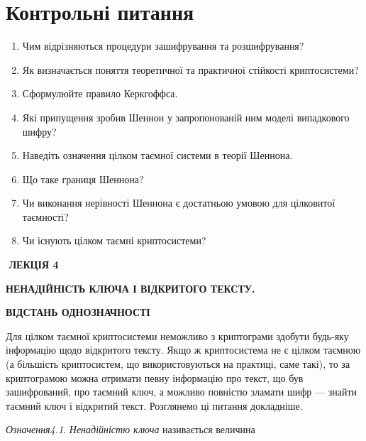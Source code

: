 \section{Контрольні питання}


\bigskip


\bigskip

\liststyleWWviiiNumxlv
\begin{enumerate}
\item Чим відрізняються процедури зашифрування та розшифрування?
\item Як визначається поняття теоретичної та практичної стійкості криптосистеми?
\item Сформулюйте правило Керкгоффса.
\item Які припущення зробив Шеннон у запропонованій ним моделі випадкового
шифру?
\item Наведіть означення цілком таємної системи в теорії Шеннона.
\item Що таке границя Шеннона?
\item Чи виконання нерівності Шеннона є достатньою умовою для цілковитої
таємності?
\item Чи існують цілком таємні криптосистеми? 
\end{enumerate}

\bigskip


\bigskip


\bigskip

 $ $\textbf{ ЛЕКЦІЯ  4}


\bigskip

{\centering\bfseries
НЕНАДІЙНІСТЬ  КЛЮЧА  І  ВІДКРИТОГО  ТЕКСТУ.
\par}

{\centering\bfseries
 ВІДСТАНЬ  ОДНОЗНАЧНОСТІ
\par}


\bigskip


\bigskip

Для цілком таємної криптосистеми неможливо з криптограми здобути будь-яку
інформацію щодо відкритого тексту. Якщо ж криптосистема не є цілком таємною (а
більшість криптосистем, що використовуються на практиці, саме такі), то за
криптограмою  можна отримати певну інформацію про текст, що був зашифрований,
про таємний ключ, а можливо повністю зламати шифр --- знайти таємний ключ і
відкритий текст. Розглянемо ці питання докладніше.


\bigskip

\textit{Означення4.1}.  \textit{Ненадійністю ключа }називається  величина 

